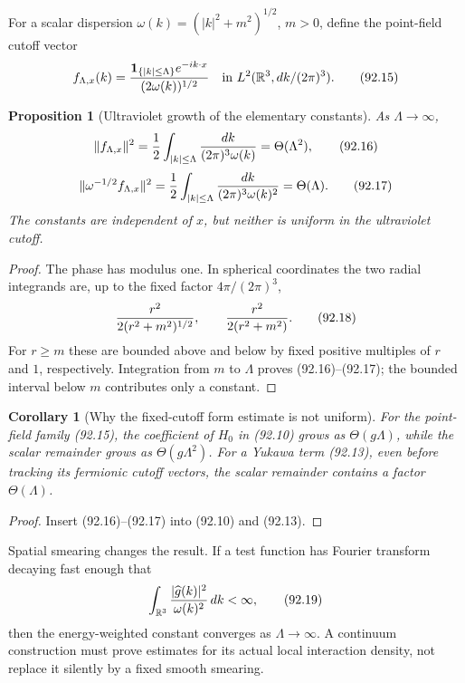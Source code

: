 \documentclass[11pt]{article}
\newtheorem{proposition}[theorem]{Proposition}
\newtheorem{corollary}[theorem]{Corollary}
\theoremstyle{remark}
\begin{document}
For a scalar dispersion
\(\omega(k)=(|k|^2+m^2)^{1/2}\), \(m>0\), define the point-field
cutoff vector
\[
 f_{\Lambda,x}(k)
 ={ {\bf1}_{\{|k|\leq\Lambda\}}e^{-ik\cdot x}
    \over(2\omega(k))^{1/2}}
\quad\hbox{in }L^2(\mathbb R^3,dk/(2\pi)^3).           \tag{92.15}
\]

\begin{proposition}[Ultraviolet growth of the elementary constants]
\label{prop:v15v92-uv}
As \(\Lambda\to\infty\),
\[
 \|f_{\Lambda,x}\|^2
 ={1\over2}\int_{|k|\leq\Lambda}{dk\over(2\pi)^3\omega(k)}
 =\Theta(\Lambda^2),                                  \tag{92.16}
\]
\[
 \|\omega^{-1/2}f_{\Lambda,x}\|^2
 ={1\over2}\int_{|k|\leq\Lambda}{dk\over(2\pi)^3\omega(k)^2}
 =\Theta(\Lambda).                                    \tag{92.17}
\]
The constants are independent of \(x\), but neither is uniform in
the ultraviolet cutoff.
\end{proposition}

\begin{proof}
The phase has modulus one.  In spherical coordinates the two radial
integrands are, up to the fixed factor \(4\pi/(2\pi)^3\),
\[
 {r^2\over2(r^2+m^2)^{1/2}},
 \qquad
 {r^2\over2(r^2+m^2)}.                                \tag{92.18}
\]
For \(r\geq m\) these are bounded above and below by fixed positive
multiples of \(r\) and \(1\), respectively.  Integration from
\(m\) to \(\Lambda\) proves (92.16)--(92.17); the bounded interval
below \(m\) contributes only a constant.
\end{proof}

\begin{corollary}[Why the fixed-cutoff form estimate is not uniform]
\label{cor:v15v92-uv-loss}
For the point-field family (92.15), the coefficient of \(H_0\) in
(92.10) grows as \(\Theta(g\Lambda)\), while the scalar remainder
grows as \(\Theta(g\Lambda^2)\).  For a Yukawa term (92.13), even
before tracking its fermionic cutoff vectors, the scalar remainder
contains a factor \(\Theta(\Lambda)\).
\end{corollary}

\begin{proof}
Insert (92.16)--(92.17) into (92.10) and (92.13).
\end{proof}

Spatial smearing changes the result.  If a test function has Fourier
transform decaying fast enough that
\[
 \int_{\mathbb R^3}{|\widehat g(k)|^2\over\omega(k)^2}\,dk<\infty,
                                                               \tag{92.19}
\]
then the energy-weighted constant converges as
\(\Lambda\to\infty\).  A continuum construction must prove estimates
for its actual local interaction density, not replace it silently by
a fixed smooth smearing.
\end{document}
